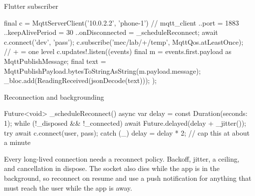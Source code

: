\documentclass[10pt,aspectratio=169,t]{beamer}
\begin{document}
\begin{frame}[fragile,eyebrow=Both ends]{Flutter subscriber}
  \vskip 1mm
\begin{dart}
final c = MqttServerClient('10.0.2.2', 'phone-1')  // mqtt_client
  ..port = 1883
  ..keepAlivePeriod = 30
  ..onDisconnected = _scheduleReconnect;
await c.connect('dev', 'pass');
c.subscribe('mec/lab/+/temp', MqttQos.atLeastOnce);  // + = one level
c.updates!.listen((events) {
  final m = events.first.payload as MqttPublishMessage;
  final text = MqttPublishPayload.bytesToStringAsString(m.payload.message);
  _bloc.add(ReadingReceived(jsonDecode(text)));
});
\end{dart}
\end{frame}

\begin{frame}[fragile,eyebrow=Both ends]{Reconnection and backgrounding}
\begin{dart}
Future<void> _scheduleReconnect() async {
  var delay = const Duration(seconds: 1);
  while (!_disposed && !_connected) {
    await Future.delayed(delay + _jitter());
    try { await c.connect(user, pass); } catch (_) {}
    delay = delay * 2;          // cap this at about a minute
  }
}
\end{dart}
  \begin{takeaway}{Every long-lived connection needs a reconnect policy.}
    Backoff, jitter, a ceiling, and cancellation in dispose. The socket also dies while the app is in the background, so reconnect on resume and use a push notification for anything that must reach the user while the app is away.
  \end{takeaway}
\end{frame}
\end{document}

